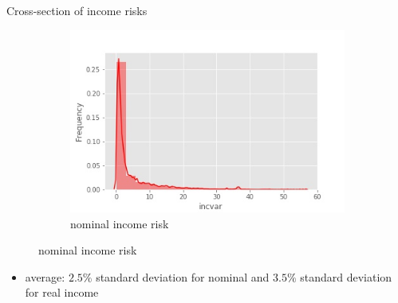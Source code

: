 \documentclass{beamer}
\begin{document}

\begin{frame}{Cross-section of income risks}
	\begin{figure}
		\centering
		\label{incvar_hist}
			\begin{subfigure}[b]{0.45\textwidth}
			\centering
			\caption{nominal income risk}
		\includegraphics[width=\textwidth]{figures/hist_incvar}
		\end{subfigure}
	\end{figure}
	\begin{itemize}
		\item average:  $2.5\%$ standard deviation for nominal and $3.5\%$ standard deviation for real income
	\end{itemize}
\end{frame}
\end{document}
